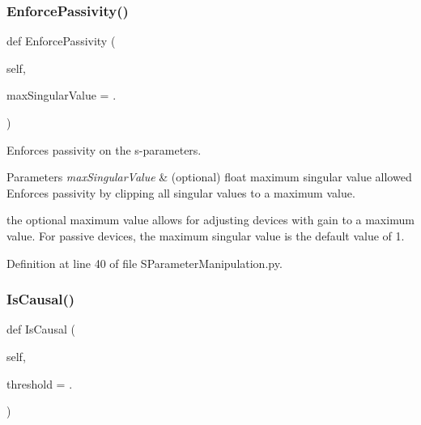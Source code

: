 \subsubsection{\texorpdfstring{Enforce\+Passivity()}{EnforcePassivity()}}
{\footnotesize\ttfamily def Enforce\+Passivity (\begin{DoxyParamCaption}\item[{}]{self,  }\item[{}]{max\+Singular\+Value = {.} }\end{DoxyParamCaption})}



Enforces passivity on the s-\/parameters. 


\begin{DoxyParams}{Parameters}
{\em max\+Singular\+Value} & (optional) float maximum singular value allowed Enforces passivity by clipping all singular values to a maximum value.\\
\hline
\end{DoxyParams}
the optional maximum value allows for adjusting devices with gain to a maximum value. For passive devices, the maximum singular value is the default value of 1. 

Definition at line 40 of file S\+Parameter\+Manipulation.\+py.

\mbox{\label{classSignalIntegrity_1_1SParameters_1_1SParameterManipulation_1_1SParameterManipulation_a4bb07518fdccfa71483dc4e98eb83083}} 
\subsubsection{\texorpdfstring{Is\+Causal()}{IsCausal()}}
{\footnotesize\ttfamily def Is\+Causal (\begin{DoxyParamCaption}\item[{}]{self,  }\item[{}]{threshold = {.} }\end{DoxyParamCaption})}



